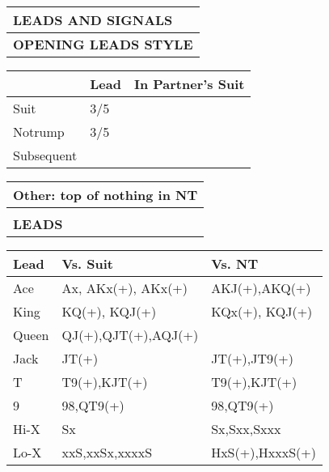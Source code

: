 \documentclass{article}
\begin{document}
\begin{minipage}{90mm}
	\begin{tabular}{| p{88mm} |}
		\hline
		\cellcolor[gray]{0.9} \textbf{LEADS AND SIGNALS} \\ \hline
		\textbf{OPENING LEADS STYLE} \\ \hline
	\end{tabular}
	\begin{tabular}{| p{15.25mm} | p{32mm} | p{32mm} |}
		& Lead & In Partner's Suit \\ \hline
		Suit       &3/5 & \\ \hline
		Notrump    &3/5 & \\ \hline
		Subsequent & & \\ \hline
	\end{tabular}
	\begin{tabular}{| p{88mm} |}
		Other: top of nothing in NT \\ \hline
		\\ \hline
		\textbf{LEADS} \\ \hline
	\end{tabular}
	\begin{tabular}{| p{11.25mm} | p{34mm} | p{34mm} |}
		Lead   & Vs. Suit            & Vs. NT \\ \hline
                Ace    &Ax, AKx(+), AKx(+)   & AKJ(+),AKQ(+) \\ \hline
                King   &KQ(+), KQJ(+)        &KQx(+), KQJ(+) \\ \hline
                Queen  &QJ(+),QJT(+),AQJ(+)  & \\ \hline
                Jack   &JT(+)                & JT(+),JT9(+) \\ \hline
                T      &T9(+),KJT(+)         & T9(+),KJT(+) \\ \hline
                9      &98,QT9(+)         & 98,QT9(+) \\ \hline

                Hi-X   & Sx                  &Sx,Sxx,Sxxx \\ \hline
                Lo-X   &xxS,xxSx,xxxxS       & HxS(+),HxxxS(+)\\ \hline
	\end{tabular}
	\begin{tabular}{| p{88mm} |}


\end{tabular}
\end{minipage}
\end{document}
